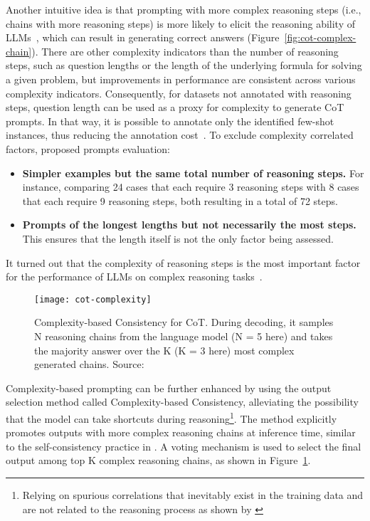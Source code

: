 Another intuitive idea is that prompting with more complex reasoning steps (i.e., chains with more reasoning steps) is more likely to elicit the reasoning ability of LLMs~\cite{fu2022complexity}, which can result in generating correct answers (Figure~\ref{fig:cot-complex-chain}).
There are other complexity indicators than the number of reasoning steps, such as question lengths or the length of the underlying formula for solving a given problem, but improvements in performance are consistent across various complexity indicators.
Consequently, for datasets not annotated with reasoning steps, question length can be used as a proxy for complexity to generate CoT prompts.
In that way, it is possible to annotate only the identified few-shot instances, thus reducing the annotation cost~\cite{fu2022complexity}.
To exclude complexity correlated factors, \textcite{fu2022complexity} proposed prompts evaluation:
\begin{itemize}
	\item \textbf{Simpler examples but the same total number of reasoning steps.} {For instance, comparing 24 cases that each require 3 reasoning steps with 8 cases that each require 9 reasoning steps, both resulting in a total of 72 steps.}
	\item \textbf{Prompts of the longest lengths but not necessarily the most steps.} {This ensures that the length itself is not the only factor being assessed.}
\end{itemize}
It turned out that the complexity of reasoning steps is the most important factor for the performance of LLMs on complex reasoning tasks~\cite{fu2022complexity}.
\begin{figure}[h!]
	\centering
	\texttt{[image: cot-complexity]}
	\caption{Complexity-based Consistency for CoT. During decoding, it samples N reasoning chains from the language model (N = 5 here) and takes the majority answer over the K (K = 3 here) most complex generated chains. Source: \textcite{fu2022complexity}}
	\label{fig:complexity}
\end{figure}
Complexity-based prompting can be further enhanced by using the output selection method called Complexity-based Consistency, alleviating the possibility that the model can take shortcuts during reasoning\footnote{Relying on spurious correlations that inevitably exist in the training data and are not related to the reasoning process as shown by \textcite{mudrakarta2018model, li2021why, sugawara2018makes}}.
The method explicitly promotes outputs with more complex reasoning chains at inference time, similar to the self-consistency practice in \textcite{wang2022self}.
A voting mechanism is used to select the final output among top K complex reasoning chains, as shown in Figure~\ref{fig:complexity}.

